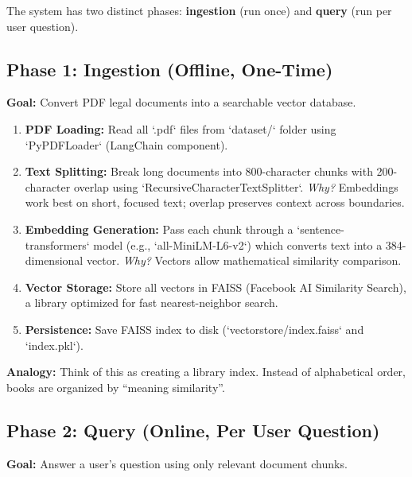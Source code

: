 \documentclass[11pt,a4paper]{article}
\begin{document}
The system has two distinct phases: \textbf{ingestion} (run once) and \textbf{query} (run per user question).

\subsection{Phase 1: Ingestion (Offline, One-Time)}

\textbf{Goal:} Convert PDF legal documents into a searchable vector database.

\begin{enumerate}
\item \textbf{PDF Loading:} Read all `.pdf` files from `dataset/` folder using `PyPDFLoader` (LangChain component).
\item \textbf{Text Splitting:} Break long documents into 800-character chunks with 200-character overlap using `RecursiveCharacterTextSplitter`. \textit{Why?} Embeddings work best on short, focused text; overlap preserves context across boundaries.
\item \textbf{Embedding Generation:} Pass each chunk through a `sentence-transformers` model (e.g., `all-MiniLM-L6-v2`) which converts text into a 384-dimensional vector. \textit{Why?} Vectors allow mathematical similarity comparison.
\item \textbf{Vector Storage:} Store all vectors in FAISS (Facebook AI Similarity Search), a library optimized for fast nearest-neighbor search.
\item \textbf{Persistence:} Save FAISS index to disk (`vectorstore/index.faiss` and `index.pkl`).
\end{enumerate}

\textbf{Analogy:} Think of this as creating a library index. Instead of alphabetical order, books are organized by ``meaning similarity''.

\subsection{Phase 2: Query (Online, Per User Question)}

\textbf{Goal:} Answer a user's question using only relevant document chunks.
\end{document}
